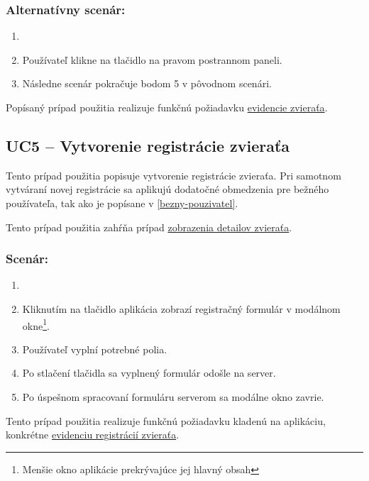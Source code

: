 \subsubsection*{Alternatívny scenár:}

\begin{enumerate}
	\item {}
	\item Používateľ klikne na tlačidlo  na pravom postrannom paneli.
	\item Následne scenár pokračuje bodom 5 v pôvodnom scenári.
\end{enumerate}

Popísaný prípad použitia realizuje funkčnú požiadavku \hyperref[evidencia-zvierat]{evidencie zvieraťa}.

\subsection*{UC5 -- Vytvorenie registrácie zvieraťa}

Tento prípad použitia popisuje vytvorenie registrácie zvieraťa. Pri samotnom vytváraní novej registrácie sa aplikujú dodatočné obmedzenia pre bežného používateľa, tak ako je popísane v \ref{bezny-pouzivatel}.

Tento prípad použitia zahŕňa prípad \hyperref[uc2]{zobrazenia detailov zvieraťa}.

\subsubsection*{Scenár:}

\begin{enumerate}
	\item {}
	\item Kliknutím na tlačidlo  aplikácia zobrazí registračný formulár v modálnom okne\footnote{Menšie okno aplikácie prekrývajúce jej hlavný obsah}.
	\item Používateľ vyplní potrebné polia.
	\item Po stlačení tlačidla  sa vyplnený formulár odošle na server.
	\item Po úspešnom spracovaní formuláru serverom sa modálne okno zavrie.
\end{enumerate}

Tento prípad použitia realizuje funkčnú požiadavku kladenú na aplikáciu, konkrétne \hyperref[evidencia-registracii-zvierata]{evidenciu registrácií zvieraťa}.

